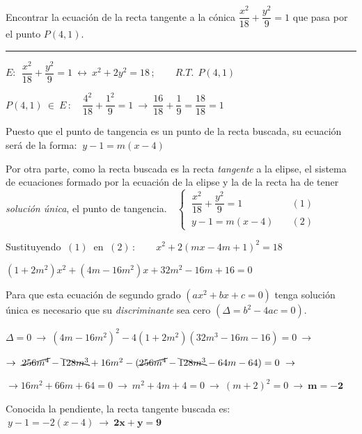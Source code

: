 \vspace{5mm}

\begin{miejercicio}

Encontrar la ecuación de la recta tangente a la cónica $\dfrac {x^2}{18}+\dfrac{y^2}{9}=1$ que pasa por el punto $P(4,1)$.

\rule{250pt}{0.1pt}

\vspace{2mm}
$E:\ \ \dfrac {x^2}{18}+\dfrac{y^2}{9}=1 \ \leftrightarrow \ x^2+2y^2=18\, ; \qquad R.T. \ \ P(4,1)$

$P(4,1)\ \in \ E \, : \quad \dfrac {4^2}{18}+\dfrac{1^2}{9}=1 \ \to \ \dfrac {16}{18}+\dfrac{1}{9}=\dfrac{18}{18}=1	$

\vspace{2mm} Puesto que el punto de tangencia es un punto de la recta buscada, su ecuación será de la forma:
$\ y-1=m(x-4)\ $

\vspace{2mm} Por otra parte, como la recta buscada es la recta \emph{tangente} a la elipse, el sistema de ecuaciones formado por la ecuación de la elipse y la de la recta ha de tener \emph{solución única}, el punto de tangencia.
$\ \ \ \begin{cases}
\ \dfrac {x^2}{18}+\dfrac{y^2}{9}=1 & \quad (1)\\
\ y-1=m(x-4) & \quad (2)
\end{cases}$

\vspace{2mm} Sustituyendo $\ (1)\ $ en $\ (2)\, :\qquad x^2+2(mx-4m+1)^2=18$

\vspace{2mm}  $(1+2m^2)x^2+(4m-16m^2)x+32m^2-16m+16=0$

\vspace{2mm}  Para que esta ecuación de segundo grado \textcolor{gris}{$(ax^2+bx+c=0)$} tenga solución única es necesario que su \emph{discriminante} sea cero \textcolor{gris}{$(\Delta=b^2-4ac=0)$}.

\vspace{2mm}  $\Delta=0 \ \to \ (4m-16m^2)^2-4(1+2m^2)(32m^3-16m-16)=0 \ \to $

\vspace{2mm}  $\to \ \cancel{256m^4}- \bcancel{128m^3}+16m^2-( \cancel{256m^4}-\bcancel{128m^3}-64m-64)=0  \ \to $

\vspace{2mm}  $\to  16m^2+66m+64=0 \ \to \ m^2+4m+4=0 \ \to \ (m+2)^2=0 \ \to \ \boldsymbol{m=-2}$

\vspace{2mm}  Conocida la pendiente, la recta tangente buscada es: $\ y-1=-2(x-4) \ \to \ \boldsymbol{2x+y=9}$
\end{miejercicio}

